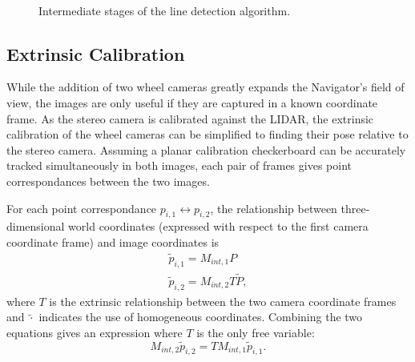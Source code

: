 \documentclass[twocolumn,11pt]{article}
\begin{document}

\begin{figure*}[t]
	\centering
	\\
	\caption{Intermediate stages of the line detection algorithm.}
	\label{fig:line-all}
\end{figure*}

\subsection{Extrinsic Calibration}
\label{sec:line-extrinsic}
While the addition of two wheel cameras greatly expands the Navigator's field
of view, the images are only useful if they are captured in a known coordinate
frame. As the stereo camera is calibrated against the LIDAR, the extrinsic
calibration of the wheel cameras can be simplified to finding their pose
relative to the stereo camera. Assuming a planar calibration checkerboard can
be accurately tracked simultaneously in both images, each pair of frames gives
point correspondances between the two images.

For each point correspondance $p_{i,1} \leftrightarrow p_{i,2}$, the relationship
between three-dimensional world coordinates (expressed with respect to the first
camera coordinate frame) and image coordinates is
\begin{align*}
	\tilde{p}_{i,1} = M_{int,1} P \\
	\tilde{p}_{i,2} = M_{int,2} T \tilde{P},
\end{align*}
where $T$ is the extrinsic relationship between the two camera coordinate frames
and $\tilde{\cdot}$ indicates the use of homogeneous coordinates. Combining the
two equations gives an expression where $T$ is the only free variable:
\begin{equation*}
	M_{int,2} \tilde{p}_{i,2} = T M_{int,1} \tilde{p}_{i,1}.
\end{equation*}
\end{document}
